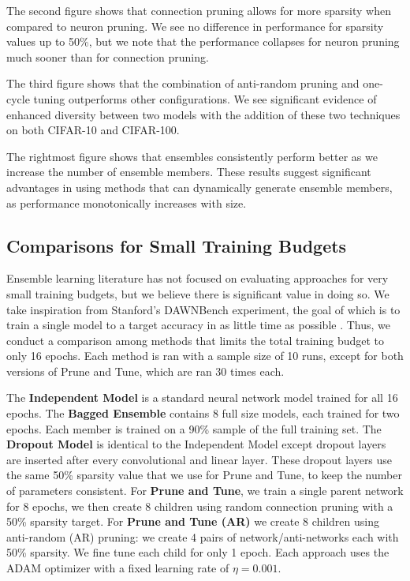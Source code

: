 \documentclass[letterpaper]{article} %
\begin{document}
The second figure shows that connection pruning allows for more sparsity when compared to neuron pruning. We see no difference in performance for sparsity values up to 50\%, but we note that the performance collapses for neuron pruning much sooner than for connection pruning.

The third figure shows that the combination of anti-random pruning and one-cycle tuning outperforms other configurations. We see significant evidence of enhanced diversity between two models with the addition of these two techniques on both CIFAR-10 and CIFAR-100.

The rightmost figure shows that ensembles consistently perform better as we increase the number of ensemble members. These results suggest significant advantages in using methods that can dynamically generate ensemble members, as performance monotonically increases with size.

\subsection{Comparisons for Small Training Budgets}

Ensemble learning literature has not focused on evaluating approaches for very small training budgets, but we believe there is significant value in doing so. We take inspiration from Stanford's DAWNBench experiment, the goal of which is to train a single model to a target accuracy in as little time as possible \cite{coleman2017DAWNBench}. Thus, we conduct a comparison among methods that limits the total training budget to only 16 epochs.
Each method is ran with a sample size of 10 runs, except for both versions of Prune and Tune, which are ran 30 times each.

The {\bf Independent Model} is a standard neural network model trained for all 16 epochs.
The {\bf Bagged Ensemble} contains 8 full size models, each trained for two epochs. Each member is trained on a 90\% sample of the full training set.
The {\bf Dropout Model} is identical to the Independent Model except dropout layers are inserted after every convolutional and linear layer.
These dropout layers use the same 50\% sparsity value that we use for Prune and Tune, to keep the number of parameters consistent. For {\bf Prune and Tune}, we train a single parent network for 8 epochs, we then create 8 children using random connection pruning with a 50\% sparsity target. For {\bf Prune and Tune (AR)} we create 8 children using anti-random (AR) pruning: we create 4 pairs of network/anti-networks each with 50\% sparsity.  We fine tune each child for only 1 epoch. Each approach uses the ADAM optimizer with a fixed learning rate of $\eta=0.001$.
\end{document}
